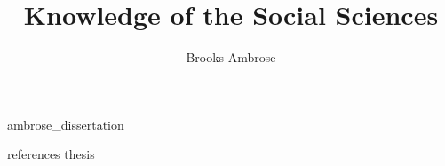 \documentclass [PhD] {uclathes}
\title          {Knowledge of the Social Sciences}
\author         {Brooks Ambrose}
\begin{document}
\makeintropages
%
%
 {ambrose_dissertation}                         %

 {references}    %
 {thesis}
\end{document}
